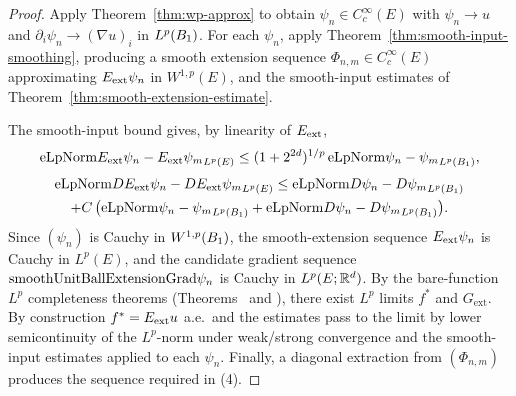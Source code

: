 \begin{proof}
\leanok
{}

Apply Theorem~\ref{thm:wp-approx} to obtain $\psi_n \in C^\infty_c(E)$ with
$\psi_n \to u$ and $\partial_i \psi_n \to (\nabla u)_i$ in $L^p(B_{1})$.
For each $\psi_n$, apply Theorem~\ref{thm:smooth-input-smoothing}, producing
a smooth extension sequence $\Phi_{n,m} \in C^\infty_c(E)$ approximating
$E_{\mathrm{ext}} \psi_n$ in $W^{1,p}(E)$, and the smooth-input estimates of
Theorem~\ref{thm:smooth-extension-estimate}.

The smooth-input bound gives, by linearity of $E_{\mathrm{ext}}$,
\begin{gather*}
\mathrm{eLpNorm}{E_{\mathrm{ext}} \psi_n - E_{\mathrm{ext}} \psi_m}_{L^p(E)}
\le (1 + 2^{2d})^{1/p}\,\mathrm{eLpNorm}{\psi_n - \psi_m}_{L^p(B_{1})},
\end{gather*}
\begin{multline*}
\mathrm{eLpNorm}{DE_{\mathrm{ext}} \psi_n - DE_{\mathrm{ext}}\psi_m}_{L^p(E)}
\le \mathrm{eLpNorm}{D\psi_n - D\psi_m}_{L^p(B_{1})} \\
+ C\,\bigl(\mathrm{eLpNorm}{\psi_n - \psi_m}_{L^p(B_{1})}
+ \mathrm{eLpNorm}{D\psi_n - D\psi_m}_{L^p(B_{1})}\bigr).
\end{multline*}
Since $(\psi_n)$ is Cauchy in $W^{1,p}(B_{1})$, the smooth-extension
sequence $E_{\mathrm{ext}}\psi_n$ is Cauchy in $L^p(E)$, and the candidate gradient
sequence $\mathrm{smoothUnitBallExtensionGrad} \psi_n$ is Cauchy in
$L^p(E;\mathbb{R}^d)$. By the bare-function $L^p$ completeness theorems
(Theorems~ and
), there exist $L^p$ limits $f^*$
and $G_{\mathrm{ext}}$. By construction $f^* = E_{\mathrm{ext}} u$ a.e.\ and the
estimates pass to the limit by lower semicontinuity of the $L^p$-norm under
weak/strong convergence and the smooth-input estimates applied to each
$\psi_n$. Finally, a diagonal extraction from $(\Phi_{n,m})$ produces the
sequence required in (4).
\end{proof}

